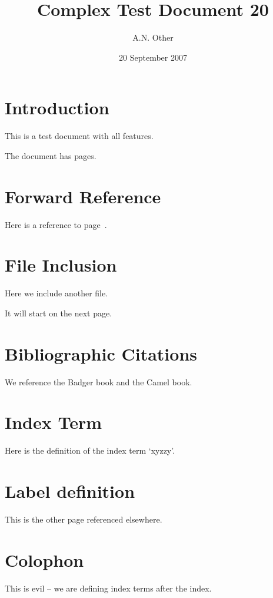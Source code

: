 \documentclass{article}
\date{20 September 2007}
\author{A.N. Other}
\title{Complex Test Document 20}
\begin{document}
\maketitle
\tableofcontents

\pagebreak
\section{Introduction}
This is a test document with all features.

The document has \pageref{LastPage} pages.

\pagebreak
\section{Forward Reference}

Here is a reference to page~\pageref{otherpage}.

\pagebreak
\section{File Inclusion}

Here we include another f{}ile.

It will start on the next page.




\pagebreak
\section{Bibliographic Citations}
We reference the Badger book\cite{wardley-ptt-2003} and the Camel book\cite{wall-perl-2000}.

\pagebreak
\section{Index Term}

Here is the def{}inition of the index term `xyzzy'.


\pagebreak
\section{Label definition}
This is the other page\label{otherpage} referenced elsewhere.


\pagebreak

\pagebreak
\printindex

\section{Colophon}

This is evil -- we are def{}ining index terms after the index.
\end{document}
